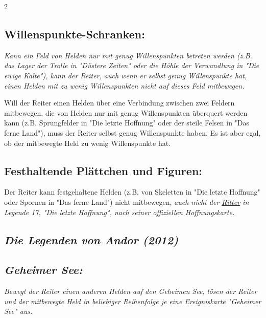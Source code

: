 \documentclass[10pt, a4paper, oneside]{book}
\newcommand{\fan}[1]{\textit{#1}}
\begin{document}
\begin{multicols*}{2}
\begin{nobgcolor}
\subsection{Willenspunkte-Schranken:}

\fan{Kann ein Feld von Helden nur mit genug Willenspunkten betreten werden (z.B. das Lager der Trolle in "Düstere Zeiten" oder die Höhle der Verwandlung in "Die ewige Kälte"), kann der Reiter, auch wenn er selbst genug Willenspunkte hat, einen Helden mit zu wenig Willenspunkten nicht auf dieses Feld mitbewegen.}

Will der Reiter einen Helden über eine Verbindung zwischen zwei Feldern mitbewegen, die von Helden nur mit genug Willenspunkten überquert werden kann (z.B. Sprungfelder in "Die letzte Hoffnung"\supercite{DlH:Begleitheft,DlH:FAQ} oder der steile Felsen in "Das ferne Land"\supercite{DfL:Begleitheft,DfL2:Erkungsungskarte_555}), muss der Reiter selbst genug Willenspunkte haben. Es ist aber egal, ob der mitbewegte Held zu wenig Willenspunkte hat.




\subsection{Festhaltende Plättchen und Figuren:}

Der Reiter kann festgehaltene Helden (z.B. von Skeletten in "Die letzte Hoffnung" oder Spornen in "Das ferne Land") nicht mitbewegen,\supercite{49724,127533} \fan{auch nicht der \hyperref[Ritter]{\fan{Ritter}} in Legende 17, "Die letzte Hoffnung", nach seiner offiziellen Hoffnungskarte.}





\end{nobgcolor}








\begin{bgcolor}
\section{\fan{Die Legenden von Andor (2012)}}


\subsection{\fan{Geheimer See:}}

\fan{Bewegt der Reiter einen anderen Helden auf den Geheimen See, lösen der Reiter und der mitbewegte Held in beliebiger Reihenfolge je eine Ereigniskarte "Geheimer See" aus.}




\end{bgcolor}
\end{multicols*}
\end{document}
